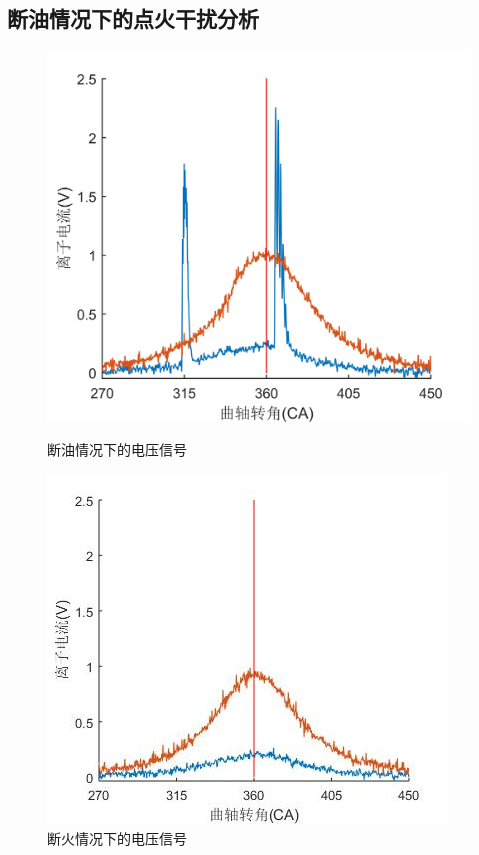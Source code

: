 \subsection{断油情况下的点火干扰分析}
\begin{figure}[htb]
	\begin{minipage}[t]{0.5\linewidth}
		\centering
		\includegraphics[width=\textwidth]{thesis_figure/ion_chapter/dy_ion}
		\caption{断油情况下的电压信号}
		\label{fig:dy_ion}
	\end{minipage}
	\begin{minipage}[t]{0.5\linewidth}
		\centering
		\includegraphics[width=\textwidth]{thesis_figure/ion_chapter/dh_ion}
		\caption{断火情况下的电压信号}
		\label{fig:dh_ion}
	\end{minipage}
\end{figure}
